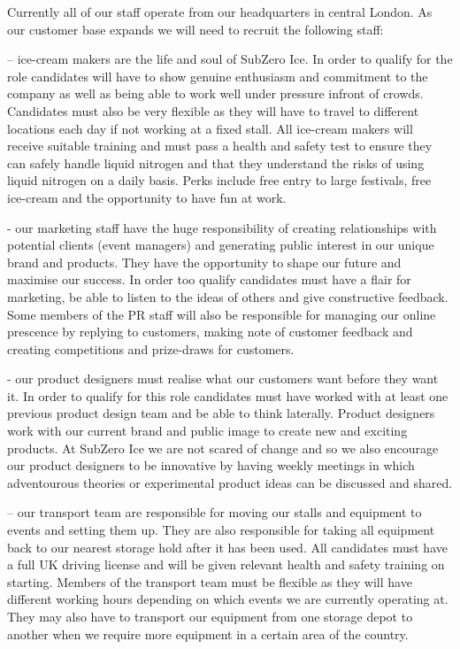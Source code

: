 \documentclass{article}
\begin{document}
  Currently all of our staff operate from our headquarters in central London. As our customer base expands we will need to recruit the following staff:

  – ice-cream makers are the life and soul of SubZero Ice. In order to qualify for the role candidates will have to show genuine enthusiasm and commitment to the company as well as being able to work well under pressure infront of crowds. Candidates must also be very flexible as they will have to travel to different locations each day if not working at a fixed stall. All ice-cream makers will receive suitable training and must pass a health and safety test to ensure they can safely handle liquid nitrogen and that they understand the risks of using liquid nitrogen on a daily basis. Perks include free entry to large festivals, free ice-cream and the opportunity to have fun at work.

  - our marketing staff have the huge responsibility of creating relationships with potential clients (event managers) and generating public interest in our unique brand and products. They have the opportunity to shape our future and maximise our success. In order too qualify candidates must have a flair for marketing, be able to listen to the ideas of others and give constructive feedback. Some members of the PR staff will also be responsible for managing our online prescence by replying to customers, making note of customer feedback and creating competitions and prize-draws for customers.

 - our product designers must realise what our customers want before they want it. In order to qualify for this role candidates must have worked with at least one previous product design team and be able to think laterally. Product designers work with our current brand and public image to create new and exciting products. At SubZero Ice we are not scared of change and so we also encourage our product designers to be innovative by having weekly meetings in which adventourous theories or experimental product ideas can be discussed and shared.

 – our transport team are responsible for moving our stalls and equipment to events and setting them up. They are also responsible for taking all equipment back to our nearest storage hold after it has been used. All candidates must have a full UK driving license and will be given relevant health and safety training on starting. Members of the transport team must be flexible as they will have different working hours depending on which events we are currently operating at. They may also have to transport our equipment from one storage depot to another when we require more equipment in a certain area of the country.
\end{document}
